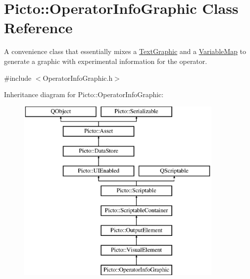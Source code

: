 \hypertarget{class_picto_1_1_operator_info_graphic}{\section{Picto\-:\-:Operator\-Info\-Graphic Class Reference}
\label{class_picto_1_1_operator_info_graphic}
}


A convenience class that essentially mixes a \hyperlink{class_picto_1_1_text_graphic}{Text\-Graphic} and a \hyperlink{class_picto_1_1_variable_map}{Variable\-Map} to generate a graphic with experimental information for the operator.  




{\ttfamily \#include $<$Operator\-Info\-Graphic.\-h$>$}

Inheritance diagram for Picto\-:\-:Operator\-Info\-Graphic\-:\begin{figure}[H]
\begin{center}
\leavevmode
\includegraphics[height=9.000000cm]{class_picto_1_1_operator_info_graphic}
\end{center}
\end{figure}
